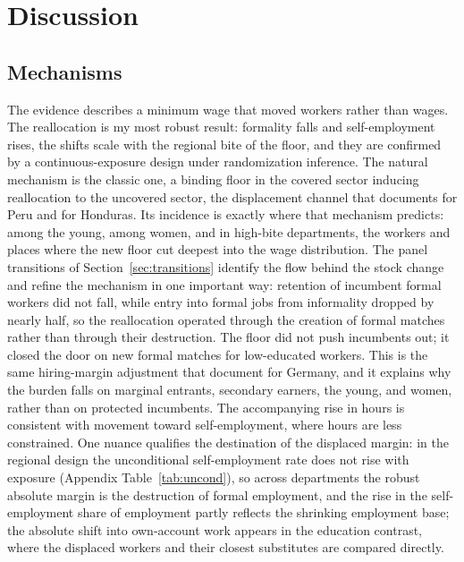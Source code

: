 \section{Discussion}\label{sec:discussion}

\subsection{Mechanisms}

The evidence describes a minimum wage that moved workers rather than wages. The reallocation is my most robust result: formality falls and self-employment rises, the shifts scale with the regional bite of the floor, and they are confirmed by a continuous-exposure design under randomization inference. The natural mechanism is the classic one, a binding floor in the covered sector inducing reallocation to the uncovered sector, the displacement channel that \citet{jaramillo_lopez_2006} documents for Peru and \citet{ham_2018_honduras} for Honduras. Its incidence is exactly where that mechanism predicts: among the young, among women, and in high-bite departments, the workers and places where the new floor cut deepest into the wage distribution. The panel transitions of Section~\ref{sec:transitions} identify the flow behind the stock change and refine the mechanism in one important way: retention of incumbent formal workers did not fall, while entry into formal jobs from informality dropped by nearly half, so the reallocation operated through the creation of formal matches rather than through their destruction. The floor did not push incumbents out; it closed the door on new formal matches for low-educated workers. This is the same hiring-margin adjustment that \citet{dustmann_2022} document for Germany, and it explains why the burden falls on marginal entrants, secondary earners, the young, and women, rather than on protected incumbents. The accompanying rise in hours is consistent with movement toward self-employment, where hours are less constrained. One nuance qualifies the destination of the displaced margin: in the regional design the unconditional self-employment rate does not rise with exposure (Appendix Table~\ref{tab:uncond}), so across departments the robust absolute margin is the destruction of formal employment, and the rise in the self-employment share of employment partly reflects the shrinking employment base; the absolute shift into own-account work appears in the education contrast, where the displaced workers and their closest substitutes are compared directly.


